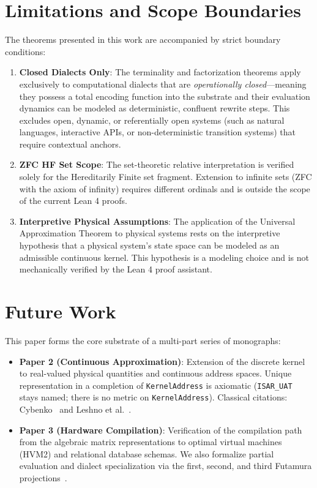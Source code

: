 \section{Limitations and Scope Boundaries}

The theorems presented in this work are accompanied by strict boundary conditions:

\begin{enumerate}
    \item \textbf{Closed Dialects Only}: The terminality and factorization theorems apply exclusively to computational dialects that are \textit{operationally closed}—meaning they possess a total encoding function into the substrate and their evaluation dynamics can be modeled as deterministic, confluent rewrite steps. This excludes open, dynamic, or referentially open systems (such as natural languages, interactive APIs, or non-deterministic transition systems) that require contextual anchors.
    \item \textbf{ZFC HF Set Scope}: The set-theoretic relative interpretation is verified solely for the Hereditarily Finite set fragment. Extension to infinite sets (ZFC with the axiom of infinity) requires different ordinals and is outside the scope of the current Lean 4 proofs.
    \item \textbf{Interpretive Physical Assumptions}: The application of the Universal Approximation Theorem to physical systems rests on the interpretive hypothesis that a physical system's state space can be modeled as an admissible continuous kernel. This hypothesis is a modeling choice and is not mechanically verified by the Lean 4 proof assistant.
\end{enumerate}

\section{Future Work}

This paper forms the core substrate of a multi-part series of monographs:
\begin{itemize}
    \item \textbf{Paper 2 (Continuous Approximation)}: Extension of the discrete kernel to real-valued physical quantities and continuous address spaces. Unique representation in a completion of \texttt{KernelAddress} is axiomatic (\texttt{ISAR\_UAT} stays named; there is no metric on \texttt{KernelAddress}). Classical citations: Cybenko~\cite{cybenko1989approximation} and Leshno et al.~\cite{leshno1993multilayer}.
    \item \textbf{Paper 3 (Hardware Compilation)}: Verification of the compilation path from the algebraic matrix representations to optimal virtual machines (HVM2) and relational database schemas. We also formalize partial evaluation and dialect specialization via the first, second, and third Futamura projections~\cite{futamura1971partial}.
\end{itemize}



